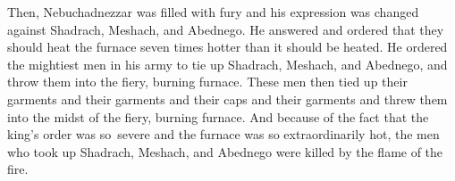 \begin{inparaenum}
   Then, Nebuchadnezzar was filled with fury and his expression was changed against Shadrach, Meshach, and Abednego. He answered and ordered that they should heat the furnace seven times hotter than it should be heated.%
   He ordered the mightiest men in his army to tie up Shadrach, Meshach, and Abednego, and throw them into the fiery, burning furnace.%
   These men then tied up their garments and their garments and their caps and their garments and threw them into the midst of the fiery, burning furnace.%
   And because of the fact that the king's order was so\understood{}\ severe and the furnace was so extraordinarily hot, the men who took up Shadrach, Meshach, and Abednego were killed by the flame of the fire.%



\end{inparaenum}
